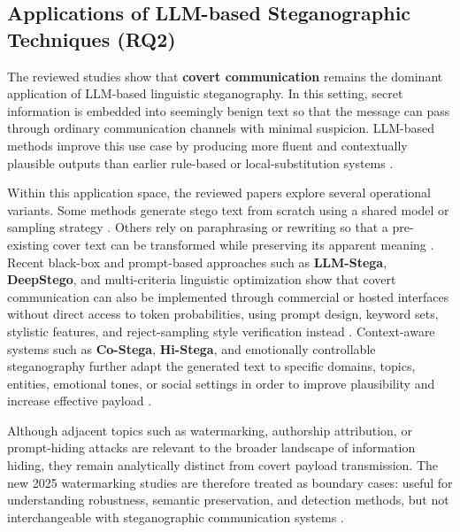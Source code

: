 \subsection{Applications of LLM-based Steganographic Techniques (RQ2)}
\label{subsec:rq2}

The reviewed studies show that \textbf{covert communication} remains the dominant application of LLM-based linguistic steganography. In this setting, secret information is embedded into seemingly benign text so that the message can pass through ordinary communication channels with minimal suspicion. LLM-based methods improve this use case by producing more fluent and contextually plausible outputs than earlier rule-based or local-substitution systems \cite{yang2020vae,kaptchuk2021meteor,wu2024generative}.

Within this application space, the reviewed papers explore several operational variants. Some methods generate stego text from scratch using a shared model or sampling strategy \cite{ding2023discop,kaptchuk2021meteor,chen2025cdea,wang2025rsstega}. Others rely on paraphrasing or rewriting so that a pre-existing cover text can be transformed while preserving its apparent meaning \cite{li2023rewriting,ou2025multigranularity}. Recent black-box and prompt-based approaches such as \textbf{LLM-Stega}, \textbf{DeepStego}, and multi-criteria linguistic optimization show that covert communication can also be implemented through commercial or hosted interfaces without direct access to token probabilities, using prompt design, keyword sets, stylistic features, and reject-sampling style verification instead \cite{wu2024generative,kuznetsov2025deepstego,wozniak2025multicriteria}. Context-aware systems such as \textbf{Co-Stega}, \textbf{Hi-Stega}, and emotionally controllable steganography further adapt the generated text to specific domains, topics, entities, emotional tones, or social settings in order to improve plausibility and increase effective payload \cite{liao2024co,wang2023hi,shi2025emotionally}.

Although adjacent topics such as watermarking, authorship attribution, or prompt-hiding attacks are relevant to the broader landscape of information hiding, they remain analytically distinct from covert payload transmission. The new 2025 watermarking studies are therefore treated as boundary cases: useful for understanding robustness, semantic preservation, and detection methods, but not interchangeable with steganographic communication systems \cite{wang2025contrastive}.

